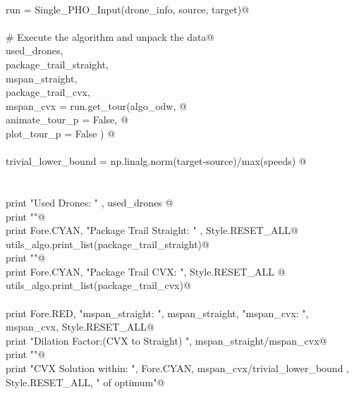 \documentclass[10.0pt]{report}
\begin{document}
\begin{flushleft}
\begin{minipage}{\linewidth}
\begin{list}{}{}
\mbox{}\verb@@\\
\mbox{}\verb@    run = Single_PHO_Input(drone_info, source, target)@\\
\mbox{}\verb@@\\
\mbox{}\verb@    # Execute the algorithm and unpack the data@\\
\mbox{}\verb@    used_drones,           \@\\
\mbox{}\verb@    package_trail_straight,\@\\
\mbox{}\verb@    mspan_straight,        \@\\
\mbox{}\verb@    package_trail_cvx,     \@\\
\mbox{}\verb@    mspan_cvx = run.get_tour(algo_odw, @\\
\mbox{}\verb@                             animate_tour_p = False, @\\
\mbox{}\verb@                             plot_tour_p    = False )     @\\
\mbox{}\verb@@\\
\mbox{}\verb@    trivial_lower_bound = np.linalg.norm(target-source)/max(speeds) @\\
\mbox{}\verb@@\\
\mbox{}\verb@@\\
\mbox{}\verb@    print "Used Drones: "   , used_drones @\\
\mbox{}\verb@    print "\n"@\\
\mbox{}\verb@    print Fore.CYAN, "Package Trail Straight: " , Style.RESET_ALL@\\
\mbox{}\verb@    utils_algo.print_list(package_trail_straight)@\\
\mbox{}\verb@    print "\n"@\\
\mbox{}\verb@    print Fore.CYAN, "Package Trail CVX: ", Style.RESET_ALL        @\\
\mbox{}\verb@    utils_algo.print_list(package_trail_cvx)@\\
\mbox{}\verb@@\\
\mbox{}\verb@    print Fore.RED, "mspan_straight: ",  mspan_straight, "\n mspan_cvx:      ", mspan_cvx, Style.RESET_ALL@\\
\mbox{}\verb@    print "Dilation Factor:(CVX to Straight) ", mspan_straight/mspan_cvx@\\
\mbox{}\verb@    print ""@\\
\mbox{}\verb@    print "CVX Solution within: ", Fore.CYAN,  mspan_cvx/trivial_lower_bound , Style.RESET_ALL, " of optimum"@\\
\mbox{}\verb@@\\

\end{list}
\end{minipage}
\end{flushleft}
\end{document}
